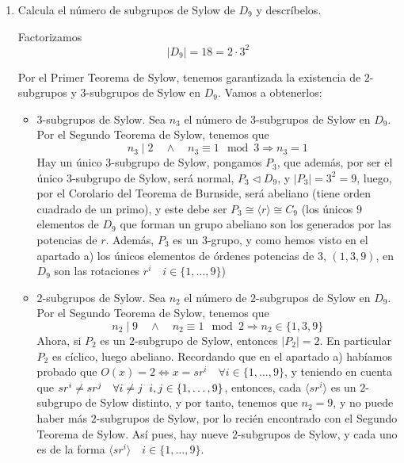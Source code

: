 \documentclass[12pt]{article}
\begin{document}
\begin{ejercicio}
\begin{enumerate}[label=(\alph*)]
            \item Calcula el número de subgrupos de Sylow de $D_9$ y descríbelos.
            
            Factorizamos $$|D_9| = 18 = 2 \cdot 3^2$$

            Por el Primer Teorema de Sylow, tenemos garantizada la existencia de $2$-subgrupos y $3$-subgrupos de Sylow en $D_9$. Vamos a obtenerlos:
            \begin{itemize}
                \item $3$-subgrupos de Sylow. Sea $n_3$ el número de $3$-subgrupos de Sylow en $D_9$. Por el Segundo Teorema de Sylow, tenemos que 
                $$n_3 \mid 2 \quad \land \quad n_3 \equiv 1 \mod 3 \Longrightarrow n_3 = 1$$
                Hay un único $3$-subgrupo de Sylow, pongamos $P_3$, que además, por ser el único $3$-subgrupo de Sylow, será normal, $P_3 \vartriangleleft D_9$, y $|P_3| = 3^2 = 9$, luego, por el Corolario del Teorema de Burnside, será abeliano (tiene orden cuadrado de un primo),
                y este debe ser $P_3 \cong \langle r \rangle \cong C_9$ (los únicos $9$ elementos de $D_9$ que forman un grupo abeliano son los generados por las potencias de $r$. Además, $P_3$ es un $3$-grupo, y como hemos visto en el apartado a) los únicos elementos de órdenes potencias de $3$, 
                $(1,3,9)$, en $D_9$ son las rotaciones $r^{i} \quad i \in \{1, \ldots, 9\}$)
                \item $2$-subgrupos de Sylow. Sea $n_2$ el número de $2$-subgrupos de Sylow en $D_9$. Por el Segundo Teorema de Sylow, tenemos que
                $$n_2 \mid 9 \quad \land \quad n_2 \equiv 1 \mod 2 \Longrightarrow n_2 \in \{1,3,9\}$$
                Ahora, si $P_2$ es un $2$-subgrupo de Sylow, entonces $|P_2| = 2$. En particular $P_2$ es cíclico, luego abeliano. Recordando que en el apartado a) habíamos probado que $O(x) = 2 \iff x = sr^i \quad \forall i \in \{1, \ldots, 9\}$, y teniendo en cuenta que
                $sr^i \neq sr^j \quad \forall i \neq j \hspace{0.2cm} i,j \in \{1, \ldots, 9\}$, entonces, cada $\langle sr^i \rangle$ es un $2$-subgrupo de Sylow distinto, y por tanto, tenemos que $n_2 = 9$, y no puede haber más $2$-subgrupos de Sylow,
                por lo recién encontrado con el Segundo Teorema de Sylow. Así pues, hay nueve $2$-subgrupos de Sylow, y cada uno es de la forma $\langle sr^i \rangle \quad i \in \{1, \ldots, 9\}$. 
            \end{itemize}


\end{enumerate}
\end{ejercicio}
\end{document}
